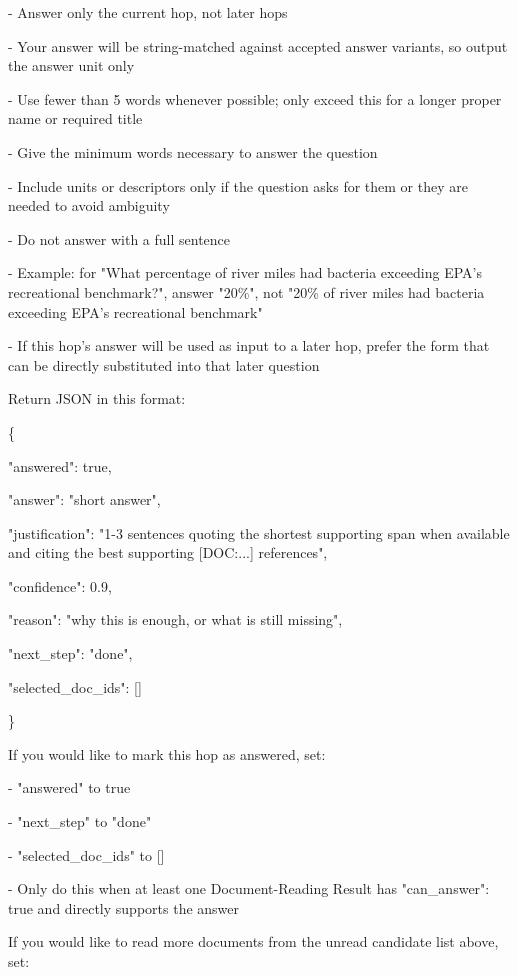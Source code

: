 \begin{tcolorbox}[colback=white, colframe=my-green, coltitle=black, parskip=5mm, title=\textbf{Hop Resolve}, halign=flush left, enhanced, breakable, skin first=enhanced, skin middle=enhanced, skin last=enhanced]
\begin{scriptsize}
- Answer only the current hop, not later hops\par
- Your answer will be string-matched against accepted answer variants, so output the answer unit only\par
- Use fewer than 5 words whenever possible; only exceed this for a longer proper name or required title\par
- Give the minimum words necessary to answer the question\par
- Include units or descriptors only if the question asks for them or they are needed to avoid ambiguity\par
- Do not answer with a full sentence\par
- Example: for "What percentage of river miles had bacteria exceeding EPA's recreational benchmark?", answer "20\%", not "20\% of river miles had bacteria exceeding EPA's recreational benchmark"\par
- If this hop's answer will be used as input to a later hop, prefer the form that can be directly substituted into that later question\par
\mbox{}\par
Return JSON in this format:\par
\{\par
  "answered": true,\par
  "answer": "short answer",\par
  "justification": "1-3 sentences quoting the shortest supporting span when available and citing the best supporting [DOC:...] references",\par
  "confidence": 0.9,\par
  "reason": "why this is enough, or what is still missing",\par
  "next\_step": "done",\par
  "selected\_doc\_ids": []\par
\}\par
\mbox{}\par
If you would like to mark this hop as answered, set:\par
- "answered" to true\par
- "next\_step" to "done"\par
- "selected\_doc\_ids" to []\par
- Only do this when at least one Document-Reading Result has "can\_answer": true and directly supports the answer\par
\mbox{}\par
If you would like to read more documents from the unread candidate list above, set:\par

\end{scriptsize}
\end{tcolorbox}
